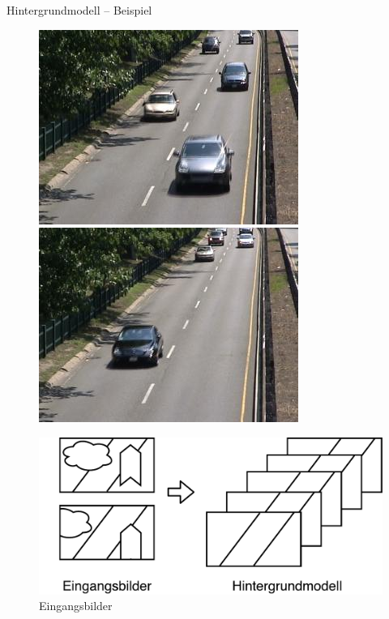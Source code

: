 \documentclass[hyperref={pdfpagelabels=false}]{beamer}
\begin{document}
\begin{frame}[t]{Hintergrundmodell -- Beispiel}
	\bigskip
	\bigskip
	\begin{figure}%
		\centering
		\begin{minipage}{0.35\linewidth}
			\centering
			\includegraphics[width=0.8\linewidth]{Abbildungen/Eingang1.jpg}\\
			\includegraphics[width=0.8\linewidth]{Abbildungen/Eingang2.jpg}
			\caption*{Eingangsbilder}
		\end{minipage}
		\begin{minipage}{0.08\linewidth}
			\centering
			\includegraphics[width=0.8\linewidth]{Abbildungen/Pfeil.pdf}

\end{minipage}
\end{figure}
\end{frame}
\end{document}
